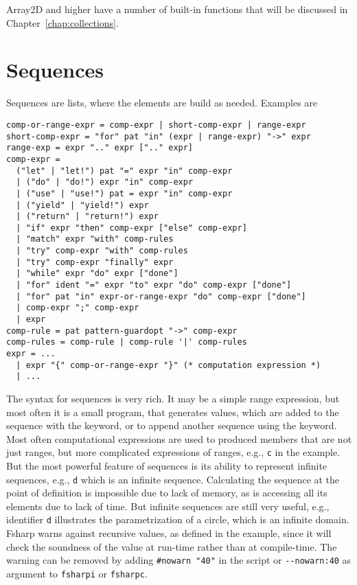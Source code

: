 Array2D and higher have a number of built-in functions that will be discussed in Chapter~\ref{chap:collections}.

\section{Sequences}
\label{sec:sequences}
Sequences are lists, where the elements are build as needed. Examples are
%
%
\begin{lstlisting}[language=ebnf]
comp-or-range-expr = comp-expr | short-comp-expr | range-expr
short-comp-expr = "for" pat "in" (expr | range-expr) "->" expr
range-exp = expr ".." expr [".." expr]
comp-expr =
  ("let" | "let!") pat "=" expr "in" comp-expr
  | ("do" | "do!") expr "in" comp-expr
  | ("use" | "use!") pat = expr "in" comp-expr
  | ("yield" | "yield!") expr
  | ("return" | "return!") expr
  | "if" expr "then" comp-expr ["else" comp-expr]
  | "match" expr "with" comp-rules
  | "try" comp-expr "with" comp-rules
  | "try" comp-expr "finally" expr
  | "while" expr "do" expr ["done"]
  | "for" ident "=" expr "to" expr "do" comp-expr ["done"]
  | "for" pat "in" expr-or-range-expr "do" comp-expr ["done"]
  | comp-expr ";" comp-expr
  | expr
comp-rule = pat pattern-guardopt "->" comp-expr
comp-rules = comp-rule | comp-rule '|' comp-rules
expr = ... 
  | expr "{" comp-or-range-expr "}" (* computation expression *)
  | ...
\end{lstlisting}
%
The syntax for sequences is very rich. It may be a simple range expression, but most often it is a small program, that generates values, which are added to the sequence with the  keyword, or to append another sequence using the  keyword. Most often computational expressions are used to produced members that are not just ranges, but more complicated expressions of ranges, e.g., \lstinline!c! in the example. But the most powerful feature of sequences is its ability to represent infinite sequences, e.g., \lstinline!d! which is an infinite sequence. Calculating the sequence at the point of definition is impossible due to lack of memory, as is accessing all its elements due to lack of time. But infinite sequences are still very useful, e.g., identifier \lstinline!d! illustrates the parametrization of a circle, which is an infinite domain. Fsharp warns against recursive values, as defined in the example, since it will check the soundness of the value at run-time rather than at compile-time. The warning can be removed by adding \lstinline!#nowarn "40"! in the script or \lstinline!--nowarn:40! as argument to \lstinline[language=console]!fsharpi! or \lstinline[language=console]!fsharpc!.

